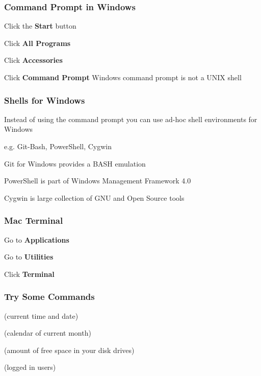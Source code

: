 \documentclass[12pt]{beamer}\usepackage[]{graphicx}\usepackage[]{color}
\begin{document}

\begin{frame}
\frametitle{Command Prompt in Windows}

\bi
  \item Click the \textbf{Start} button
  \item Click \textbf{All Programs}
  \item Click \textbf{Accessories}
  \item Click \textbf{Command Prompt}
\ei
Windows command prompt is not a UNIX shell
\eb

\end{frame}


\begin{frame}
\frametitle{Shells for Windows}

\bi
  \item Instead of using the command prompt you can use ad-hoc shell environments for Windows
  \item e.g. Git-Bash, PowerShell, Cygwin
  \item Git for Windows provides a BASH emulation
  \item PowerShell is part of Windows Management Framework 4.0
  \item Cygwin is large collection of GNU and Open Source tools
\ei

\end{frame}


\begin{frame}
\frametitle{Mac Terminal}
\begin{center}
\end{center}

\bi
  \item Go to \textbf{Applications}
  \item Go to \textbf{Utilities}
  \item Click \textbf{Terminal}
\ei
\end{frame}


\begin{frame}
\frametitle{Try Some Commands}
\bi
  \item {} (current time and date)
  \item {} (calendar of current month)
  \item {} (amount of free space in your disk drives)
  \item {} (logged in users)
  \item {}
\ei
\end{frame}
\end{document}
